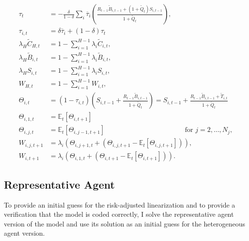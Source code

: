 \documentclass[12 pt, oneside]{article}
\theoremstyle{definition}
\theoremstyle{definition}
\theoremstyle{definition}
\newcommand{\E}{\mathbb{E}}
\begin{document}
\begin{align}
  \label{eq:common tax rate eqm stat}
  \tau_t & = -\frac{\delta}{1 - \delta}\sum_i\overline{\tau}_i\left(\frac{R_{t - 1}\tilde{B}_{i, t - 1} + (1 + \tilde{Q}_t)S_{i, t - 1}}{1 + \tilde{Q}_t}\right),\\
  \label{eq:tax rate on type i eqm stat}
  \tau_{i, t} & = \delta\overline{\tau}_i + (1 - \delta)\tau_t\\
  \label{eq:consumption market clearing eqm stat}
  \lambda_H \tilde{C}_{H, t} & = 1 - \sum_{i = 1}^{H - 1} \lambda_i \tilde{C}_{i, t},\\
  \label{eq:bond market clearing eqm stat}
  \lambda_H \tilde{B}_{i, t} & = 1 - \sum_{i = 1}^{H - 1} \lambda_i \tilde{B}_{i, t},\\
  \label{eq:share market clearing eqm stat}
  \lambda_H S_{i, t} & = 1 - \sum_{i = 1}^{H - 1} \lambda_i S_{i, t},\\
  \label{eq:wealth share market clearing eqm stat}
  W_{H, t} & = 1 - \sum_{i = 1}^{H - 1} W_{i, t},\\
  \label{eq:theta defn eqm stat}
  \Theta_{i, t} & = (1 - \tau_{i, t})\left(S_{i, t - 1} + \frac{R_{t - 1}\tilde{B}_{i, t - 1}}{1 + \tilde{Q}_t}\right) = S_{i, t - 1} + \frac{R_{t - 1} \tilde{B}_{i, t - 1} + \tilde{T}_{i, t}}{1 + \tilde{Q}_t}\\
  \label{eq:theta cond expectation 1 period defn eqm stat}
  \Theta_{i, 1, t} & = \E_t[\Theta_{i, t + 1}]\\
  \label{eq:theta cond expectation j period defn eqm stat}
  \Theta_{i, j, t} & = \E_t[\Theta_{i, j - 1, t + 1}] \quad\quad\quad\quad\quad\quad\quad\quad\quad\quad\quad\,\,\,\,\, \text{for }j = 2,\dots, N_j,\\
  \label{eq:wealth share cond expectation j period defn eqm stat}
  W_{i, j, t + 1} & = \lambda_i(\Theta_{i, j + 1, t} + (\Theta_{i, j, t + 1} - \E_t[\Theta_{i, j, t + 1}])),\\
  \label{eq:wealth share evolution eqm stat}
  W_{i, t + 1} & = \lambda_i(\Theta_{i, 1, t} + (\Theta_{i, t + 1} - \E_t[\Theta_{i, t + 1}])).
\end{align}

\subsection{Representative Agent}
To provide an initial guess for the risk-adjusted linearization and to provide a verification that the model is coded correctly, I solve the representative agent version of the model and use its solution as an initial guess for the heterogeneous agent version.
\end{document}
